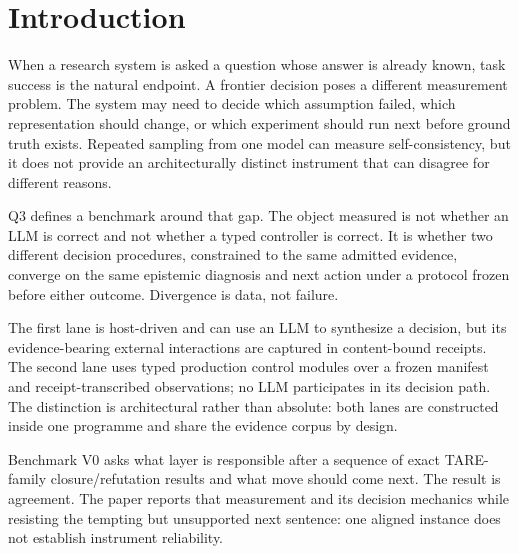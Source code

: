 \section{Introduction}

When a research system is asked a question whose answer is already known, task success is the natural endpoint. A frontier decision poses a different measurement problem. The system may need to decide which assumption failed, which representation should change, or which experiment should run next before ground truth exists. Repeated sampling from one model can measure self-consistency, but it does not provide an architecturally distinct instrument that can disagree for different reasons.

Q3 defines a benchmark around that gap. The object measured is not whether an LLM is correct and not whether a typed controller is correct. It is whether two different decision procedures, constrained to the same admitted evidence, converge on the same epistemic diagnosis and next action under a protocol frozen before either outcome. Divergence is data, not failure.

The first lane is host-driven and can use an LLM to synthesize a decision, but its evidence-bearing external interactions are captured in content-bound receipts. The second lane uses typed production control modules over a frozen manifest and receipt-transcribed observations; no LLM participates in its decision path. The distinction is architectural rather than absolute: both lanes are constructed inside one programme and share the evidence corpus by design.

Benchmark V0 asks what layer is responsible after a sequence of exact TARE-family closure/refutation results and what move should come next. The result is agreement. The paper reports that measurement and its decision mechanics while resisting the tempting but unsupported next sentence: one aligned instance does not establish instrument reliability.